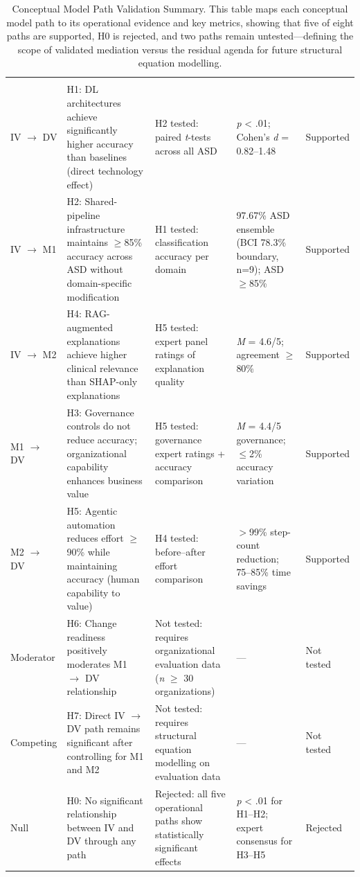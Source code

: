 {\tablestripes\tablefontsize
\begin{xltabular}{\textwidth}{@{} >{\raggedright\arraybackslash}p{2.2cm} L L L >{\raggedright\arraybackslash}p{1.8cm} @{}}
\caption[Conceptual Model Path Validation Summary]{Conceptual Model Path Validation Summary. This table maps each conceptual model path to its operational evidence and key metrics, showing that five of eight paths are supported, H0 is rejected, and two paths remain untested---defining the scope of validated mediation versus the residual agenda for future structural equation modelling.}\label{tab:conceptual_validation} \\
\toprule
{} &  &  &  &  \\
\midrule
\endfirsthead
\toprule
{} &  &  &  &  \\
\midrule
\endhead
\bottomrule
\endlastfoot
IV $\to$ DV & H1: DL architectures achieve significantly higher accuracy than baselines (direct technology effect) & H2 tested: paired \textit{t}-tests across all ASD & \textit{p} < .01; Cohen's \textit{d} = 0.82--1.48 & Supported \\
\addlinespace
IV $\to$ M1 & H2: Shared-pipeline infrastructure maintains $\geq$85\% accuracy across ASD without domain-specific modification & H1 tested: classification accuracy per domain & 97.67\% ASD ensemble (BCI 78.3\% boundary, n=9); ASD $\geq$85\% & Supported \\
\addlinespace
IV $\to$ M2 & H4: RAG-augmented explanations achieve higher clinical relevance than SHAP-only explanations & H5 tested: expert panel ratings of explanation quality & \textit{M} = 4.6/5; agreement $\geq$80\% & Supported \\
\addlinespace
M1 $\to$ DV & H3: Governance controls do not reduce accuracy; organizational capability enhances business value & H5 tested: governance expert ratings + accuracy comparison & \textit{M} = 4.4/5 governance; $\leq$2\% accuracy variation & Supported \\
\addlinespace
M2 $\to$ DV & H5: Agentic automation reduces effort $\geq$90\% while maintaining accuracy (human capability to value) & H4 tested: before--after effort comparison & $>$99\% step-count reduction; 75--85\% time savings & Supported \\
\addlinespace
Moderator & H6: Change readiness positively moderates M1 $\to$ DV relationship & Not tested: requires organizational evaluation data (\textit{n} $\geq$ 30 organizations) & --- & Not tested \\
\addlinespace
Competing & H7: Direct IV $\to$ DV path remains significant after controlling for M1 and M2 & Not tested: requires structural equation modelling on evaluation data & --- & Not tested \\
\addlinespace
Null & H0: No significant relationship between IV and DV through any path & Rejected: all five operational paths show statistically significant effects & \textit{p} < .01 for H1--H2; expert consensus for H3--H5 & Rejected \\
\end{xltabular}}
